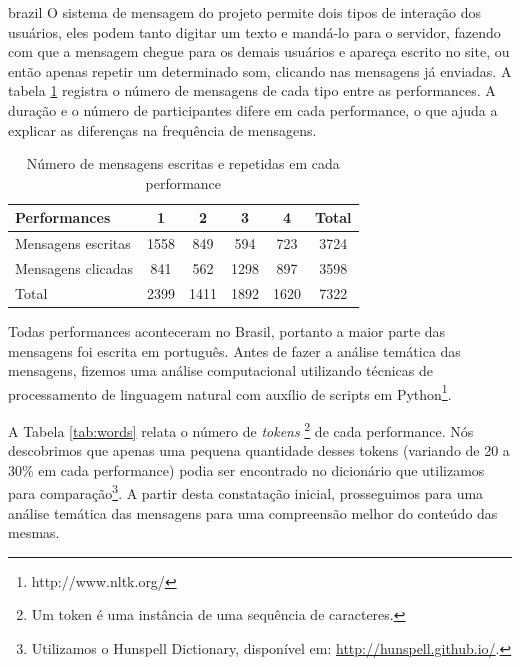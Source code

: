 \begin{otherlanguage*}{brazil}
O sistema de mensagem do projeto permite dois tipos de interação dos usuários, eles podem tanto digitar um texto e mandá-lo para o servidor, fazendo com que a mensagem chegue para os demais usuários e apareça escrito no site, ou então apenas repetir um determinado som, clicando nas mensagens já enviadas. A tabela \ref{tab:msgtype} registra o número de mensagens de cada tipo entre as performances. A duração e o número de participantes difere em cada performance, o que ajuda a explicar as diferenças na frequência de mensagens.


\begin{table}[ht!]
\caption{Número de mensagens escritas e repetidas em cada performance}{%
\begin{tabular}{@{}lccccc@{}}
\hline
Performances        & 1 & 2 & 3 & 4 & Total \\
\hline
Mensagens escritas &    1558&   849  &  594  &  723 & 3724 \\
Mensagens clicadas &    841 &   562  &  1298 &  897 & 3598 \\
Total &             2399&   1411 &  1892 & 1620 & 7322 \\
\end{tabular}}
\label{tab:msgtype}
\end{table}


Todas performances aconteceram no Brasil, portanto a maior parte das mensagens foi escrita em português. Antes de fazer a análise temática das mensagens, fizemos uma análise computacional utilizando técnicas de processamento de linguagem natural com auxílio de scripts em Python\footnote{http://www.nltk.org/}. 

A Tabela \ref{tab:words} relata o número de \emph{tokens} \footnote{Um token é uma instância de uma sequência de caracteres.} de cada performance. Nós descobrimos que apenas uma pequena quantidade desses tokens (variando de 20 a 30\% em cada performance) podia ser encontrado no dicionário que utilizamos para comparação\footnote{Utilizamos o Hunspell Dictionary, disponível em: \url{http://hunspell.github.io/}.}. A partir desta constatação inicial, prosseguimos para uma análise temática das mensagens para uma compreensão melhor do conteúdo das mesmas.



\end{otherlanguage*}
